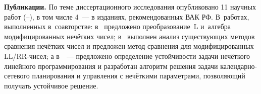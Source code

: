 \textbf{Публикации.} По теме диссертационного исследования опубликовано 11 научных работ (\cite{PMTYMM}--\cite{Kanischeva}), в том числе 4~--- в изданиях, рекомендованных ВАК РФ. В~работах, выполненных в~соавторстве: в~\cite{Vorontsov_PI} предложено преобразование~L и~алгебра модифицированных нечётких чисел; в~\cite{Vorontsov_Compare} выполнен анализ существующих методов сравнения нечётких чисел и предложен метод сравнения для модифицированных LL/RR-чисел; а в~\cite{Vorontsov_VSTU}~--- предложено определение устойчивости задачи нечёткого линейного программирования и разработан алгоритм решения задачи календарно-сетевого планирования и управления с нечёткими параметрами, позволяющий получать устойчивое решение.